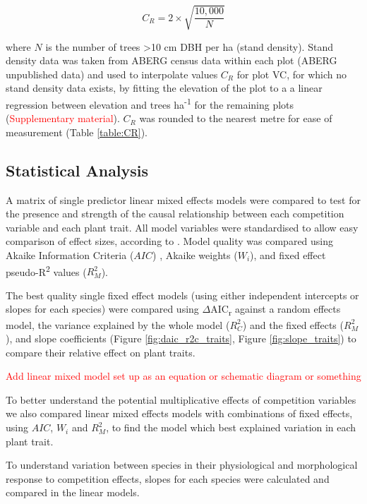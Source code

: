 \documentclass[a4paper,11pt]{article}
\newcommand{\todo}[1]{\textcolor{red}{#1}}   %
\begin{document}
\begin{equation}
\label{eq:CR}
C_R = 2 \times \sqrt{\frac{10,000}{N}}
\end{equation}

where $N$ is the number of trees \textgreater10 cm DBH per ha (stand density). Stand density data was taken from ABERG census data within each plot (ABERG unpublished data) and used to interpolate values $C_R$ for plot VC, for which no stand density data exists, by fitting the elevation of the plot to a a linear regression between elevation and trees ha\textsuperscript{-1} for the remaining plots (\todo{Supplementary material}). $C_R$ was rounded to the nearest metre for ease of measurement (Table \ref{table:CR}). 

\subsection{Statistical Analysis}
A matrix of single predictor linear mixed effects models were compared to test for the presence and strength of the causal relationship between each competition variable and each plant trait. All model variables were standardised to allow easy comparison of effect sizes, according to \citep{Gelman2008, Grueber2011, Gelman2014}. Model quality was compared using Akaike Information Criteria ($AIC$) \citep{Akaike1998}, Akaike weights ($W_i$), and fixed effect pseudo-R\textsuperscript{2} values ($R_M^2$). 

The best quality single fixed effect models (using either independent intercepts or slopes for each species) were compared using $\Delta$AIC\textsubscript{r} against a random effects model,  the variance explained by the whole model ($R_C^2$) and the fixed effects ($R_M^2$), and slope coefficients (Figure \ref{fig:daic_r2c_traits}, Figure \ref{fig:slope_traits}) to compare their relative effect on plant traits. 

\todo{Add linear mixed model set up as an equation or schematic diagram or something}

To better understand the potential multiplicative effects of competition variables we also compared linear mixed effects models with combinations of fixed effects, using $AIC$, $W_i$ and $R_M^2$, to find the model which best explained variation in each plant trait.

To understand variation between species in their physiological and morphological response to competition effects, slopes for each species were calculated and compared in the linear models. 
\end{document}
